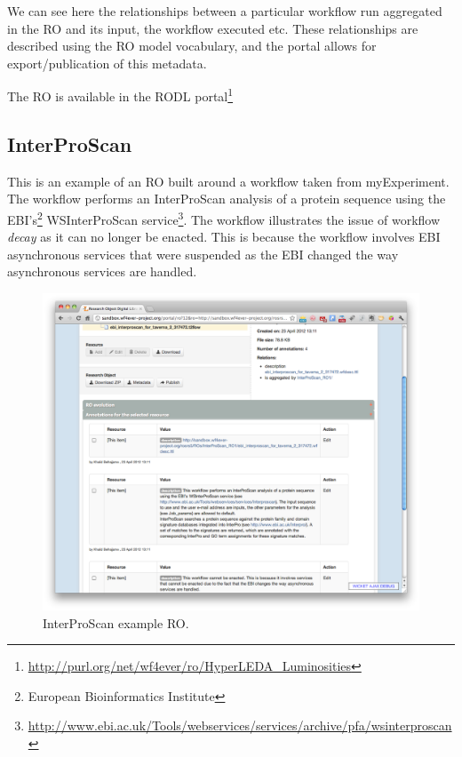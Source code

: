 We can see here the relationships between a particular workflow run
aggregated in the RO and its input, the workflow executed etc. These
relationships are described using the RO model vocabulary, and the
portal allows for export/publication of this metadata. 

The RO is available in the RODL
portal\footnote{\url{http://purl.org/net/wf4ever/ro/HyperLEDA_Luminosities}}

\subsection{InterProScan}
\label{subsec:interproscan}

This is an example of an RO built around a workflow taken from
myExperiment. The workflow performs an InterProScan analysis of a
protein sequence using the EBI's\footnote{European Bioinformatics Institute} WSInterProScan service\footnote{\url{http://www.ebi.ac.uk/Tools/webservices/services/archive/pfa/wsinterproscan}}. The
workflow illustrates the issue of workflow \emph{decay} as it can no
longer be enacted. This is because the workflow involves EBI
asynchronous services that were suspended as the EBI changed the way
asynchronous services are handled. 

\begin{figure}[h]
  \centering
  \includegraphics[width=\picwidth]{Figures/interpro}
  \caption{InterProScan example RO.}
  \label{fig:interpro}
\end{figure}

